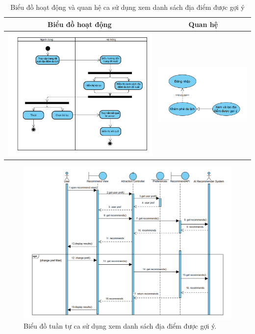 \begin{table}[H] %
    \centering
    \caption{Biểu đồ hoạt động và quan hệ ca sử dụng xem danh sách địa điểm được gợi ý} %
    \label{tab:uc_view_recommendations_diagrams} %
    \begin{tabular}{| c | c |}
        \hline
        \textbf{Biểu đồ hoạt động} & \textbf{Quan hệ} \\
        \hline
        \includegraphics[width=0.5\linewidth]{figures/c3/3-3-6-ad.png}
        &
        \includegraphics[width=0.45\linewidth]{figures/c3/3-3-6-rd.png} \\
        \hline
    \end{tabular}
\end{table}

\begin{figure}[H]
    \centering
    \includegraphics[width=1\textwidth]{figures/c3/3-3-6-sd.png} %
    \caption{Biểu đồ tuần tự ca sử dụng xem danh sách địa điểm được gợi ý.}
    \label{fig:3-3-6-sequence-diagram}
\end{figure}